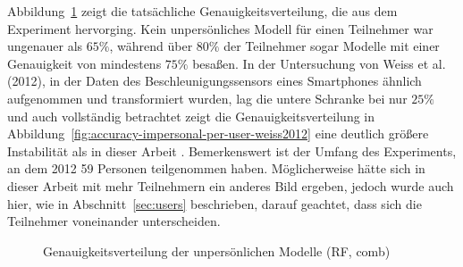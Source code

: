 Abbildung~\ref{fig:accuracy-impersonal-per-user} zeigt die tatsächliche Genauigkeitsverteilung, die aus dem Experiment hervorging. Kein unpersönliches Modell für einen Teilnehmer war ungenauer als $65 \%$, während über $80 \%$ der Teilnehmer sogar Modelle mit einer Genauigkeit von mindestens $75 \%$ besaßen. In der Untersuchung von Weiss et al. (2012), in der Daten des Beschleunigungssensors eines Smartphones ähnlich aufgenommen und transformiert wurden, lag die untere Schranke bei nur $25 \%$ und auch vollständig betrachtet zeigt die Genauigkeitsverteilung in Abbildung~\ref{fig:accuracy-impersonal-per-user-weiss2012} eine deutlich größere Instabilität als in dieser Arbeit \cite{Weiss2012}. Bemerkenswert ist der Umfang des Experiments, an dem 2012 59 Personen teilgenommen haben. Möglicherweise hätte sich in dieser Arbeit mit mehr Teilnehmern ein anderes Bild ergeben, jedoch wurde auch hier, wie in Abschnitt~\ref{sec:users} beschrieben, darauf geachtet, dass sich die Teilnehmer voneinander unterscheiden.
\begin{figure}
\centering
{}
\caption{Genauigkeitsverteilung der unpersönlichen Modelle (RF, comb)}
\label{fig:accuracy-impersonal-per-user}
\end{figure}

